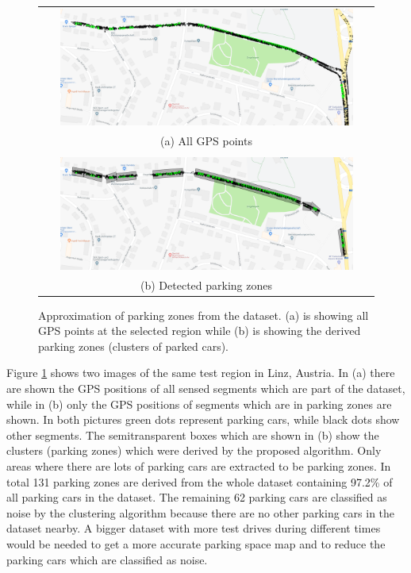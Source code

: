 \begin{figure}
\centering
\def\arraystretch{1.2}

\begin{tabular}{ c }
	\includegraphics[width=0.9\textwidth]{img/parking_space_map_all_gps_2.PNG}
	\\
	(a) All GPS points
	\\
    \\
	\includegraphics[width=0.9\textwidth]{img/parking_space_map_zones_2.PNG}
    \\
    (b) Detected parking zones
\end{tabular}

	\caption{Approximation of parking zones from the dataset. (a) is showing all GPS points at the selected region while (b) is showing the derived parking zones (clusters of parked cars).}
	\label{fig:parking_space_map}
\end{figure}

Figure \ref{fig:parking_space_map} shows two images of the same test region in Linz, Austria. In (a) there are shown the GPS positions of all sensed segments which are part of the dataset, while in (b) only the GPS positions of segments which are in parking zones are shown. In both pictures green dots represent parking cars, while black dots show other segments. The semitransparent boxes which are shown in (b) show the clusters (parking zones) which were derived by the proposed algorithm. 
Only areas where there are lots of parking cars are extracted to be parking zones. In total 131 parking zones are derived from the whole dataset containing 97.2\% of all parking cars in the dataset. The remaining 62 parking cars are classified as noise by the clustering algorithm because there are no other parking cars in the dataset nearby. A bigger dataset with more test drives during different times would be needed to get a more accurate parking space map and to reduce the parking cars which are classified as noise.





